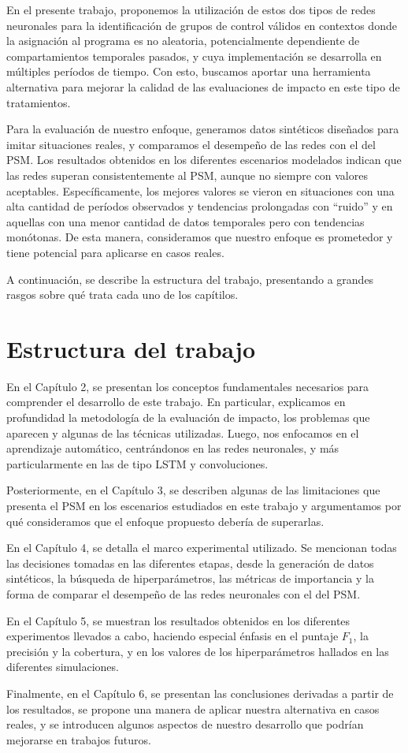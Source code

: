 \documentclass[../main.tex]{subfiles}
\begin{document}
En el presente trabajo, proponemos la utilización de estos dos tipos de redes neuronales
para la identificación de grupos de control válidos en contextos donde la asignación al
programa es no aleatoria, potencialmente dependiente de compartamientos temporales
pasados, y cuya implementación se desarrolla en múltiples períodos de tiempo. Con esto,
buscamos aportar una herramienta alternativa para mejorar la calidad de las evaluaciones
de impacto en este tipo de tratamientos.

Para la evaluación de nuestro enfoque, generamos datos sintéticos diseñados para imitar
situaciones reales, y comparamos el desempeño de las redes con el del PSM. Los resultados
obtenidos en los diferentes escenarios modelados indican que las redes superan
consistentemente al PSM, aunque no siempre con valores aceptables. Específicamente, los
mejores valores se vieron en situaciones con una alta cantidad de períodos observados y
tendencias prolongadas con ``ruido'' y en aquellas con una menor cantidad de datos
temporales pero con tendencias monótonas. De esta manera, consideramos que nuestro enfoque
es prometedor y tiene potencial para aplicarse en casos reales.

A continuación, se describe la estructura del trabajo, presentando a grandes rasgos
sobre qué trata cada uno de los capítilos.

\section*{Estructura del trabajo}
En el Capítulo 2, se presentan los conceptos fundamentales necesarios para comprender el
desarrollo de este trabajo. En particular, explicamos en profundidad la metodología de la
evaluación de impacto, los problemas que aparecen y algunas de las técnicas utilizadas.
Luego, nos enfocamos en el aprendizaje automático, centrándonos en las redes neuronales, y
más particularmente en las de tipo LSTM y convoluciones.

Posteriormente, en el Capítulo 3, se describen algunas de las limitaciones que presenta el
PSM en los escenarios estudiados en este trabajo y argumentamos por qué consideramos que
el enfoque propuesto debería de superarlas.

En el Capítulo 4, se detalla el marco experimental utilizado. Se mencionan todas las
decisiones tomadas en las diferentes etapas, desde la generación de datos sintéticos, la
búsqueda de hiperparámetros, las métricas de importancia y la forma de comparar el
desempeño de las redes neuronales con el del PSM.

En el Capítulo 5, se muestran los resultados obtenidos en los diferentes experimentos
llevados a cabo, haciendo especial énfasis en el puntaje \(F_1\), la precisión y la
cobertura, y en los valores de los hiperparámetros hallados en las diferentes
simulaciones.

Finalmente, en el Capítulo 6, se presentan las conclusiones derivadas a partir de los
resultados, se propone una manera de aplicar nuestra alternativa en casos reales, y se
introducen algunos aspectos de nuestro desarrollo que podrían mejorarse en trabajos
futuros.
\end{document}
